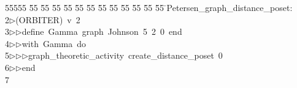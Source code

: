 %
%
\begin{tabbing}
55555 \= 55 \= 55 \= 55 \= 55 \= 55 \= 55 \= 55 \= 55 \= 55 \= 55 \= 55 \= 55 \= \>Petersen\_graph\_distance\_poset:\\[0pt]
2\>$\triangleright$\>(ORBITER)\ v\ 2\ \\[0pt]
3\>$\triangleright$\>$\triangleright$\>define\ Gamma\ graph\ Johnson\ 5\ 2\ 0\ end\ \\[0pt]
4\>$\triangleright$\>$\triangleright$\>with\ Gamma\ do\ \\[0pt]
5\>$\triangleright$\>$\triangleright$\>$\triangleright$\>graph\_theoretic\_activity\ create\_distance\_poset\ 0\ \\[0pt]
6\>$\triangleright$\>$\triangleright$\>end\\[0pt]
7\>\end{tabbing}

